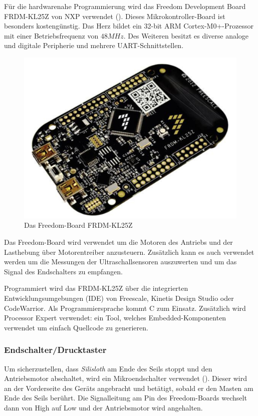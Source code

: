 Für die hardwarenahe Programmierung wird das Freedom Development Board FRDM-KL25Z  von NXP verwendet (). Dieses Mikrokontroller-Board ist besonders kostengünstig. Das Herz bildet ein 32-bit ARM Cortex-M0+-Prozessor mit einer Betriebsfrequenz von $48 MHz$. Des Weiteren besitzt es diverse analoge und digitale Peripherie und mehrere UART-Schnittstellen. 

\begin{figure}
    \centering
    \includegraphics[width=0.5\linewidth]{pics/freedom-board.jpg}
    \caption{Das Freedom-Board FRDM-KL25Z}
    \label{fig:freedom-board}
\end{figure}

Das Freedom-Board wird verwendet um die Motoren des Antriebs und der Lasthebung über Motorentreiber anzusteuern. Zusätzlich kann es auch verwendet werden um die Messungen der Ultraschallsensoren auszuwerten und um das Signal des Endschalters zu empfangen.

Programmiert wird das FRDM-KL25Z über die integrierten Entwicklungsumgebungen (IDE) von Freescale, Kinetis Design Studio oder CodeWarrior. Als Programmiersprache kommt C zum Einsatz. Zusätzlich wird Processor Expert verwendet: ein Tool, welches Embedded-Komponenten verwendet um einfach Quellcode zu generieren.

\subsubsection{Endschalter/Drucktaster}

Um sicherzustellen, dass \textit{Silisloth} am Ende des Seils stoppt und den Antriebsmotor abschaltet, wird ein Mikroendschalter  verwendet (). Dieser wird an der Vorderseite des Geräts angebracht und betätigt, sobald er den Masten am Ende des Seils berührt. Die Signalleitung am Pin des Freedom-Boards wechselt dann von High auf Low und der Antriebsmotor wird angehalten.

